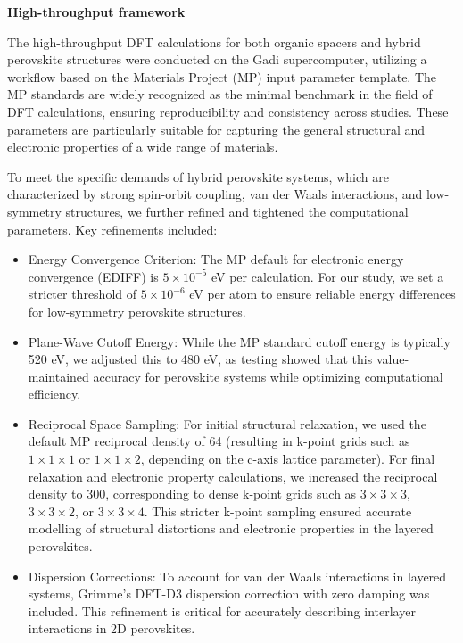 \textbf{High-throughput framework}

The high-throughput DFT calculations for both organic spacers and hybrid perovskite structures were conducted on the Gadi supercomputer, utilizing a workflow based on the Materials Project (MP) input parameter template. The MP standards are widely recognized as the minimal benchmark in the field of DFT calculations, ensuring reproducibility and consistency across studies. These parameters are particularly suitable for capturing the general structural and electronic properties of a wide range of materials.

To meet the specific demands of hybrid perovskite systems, which are characterized by strong spin-orbit coupling, van der Waals interactions, and low-symmetry structures, we further refined and tightened the computational parameters. Key refinements included:

\begin{itemize}
    \item Energy Convergence Criterion: The MP default for electronic energy convergence (EDIFF) is $5\times10^{-5}$ eV per calculation. For our study, we set a stricter threshold of $5\times10^{-6}$ eV per atom to ensure reliable energy differences for low-symmetry perovskite structures.
    \item Plane-Wave Cutoff Energy: While the MP standard cutoff energy is typically 520 eV, we adjusted this to 480 eV, as testing showed that this value-maintained accuracy for perovskite systems while optimizing computational efficiency.
    \item Reciprocal Space Sampling: For initial structural relaxation, we used the default MP reciprocal density of 64 (resulting in k-point grids such as $1\times1\times1$ or $1\times1\times2$, depending on the c-axis lattice parameter). For final relaxation and electronic property calculations, we increased the reciprocal density to 300, corresponding to dense k-point grids such as $3\times3\times3$, $3\times3\times2$, or $3\times3\times4$. This stricter k-point sampling ensured accurate modelling of structural distortions and electronic properties in the layered perovskites.
    \item Dispersion Corrections: To account for van der Waals interactions in layered systems, Grimme’s DFT-D3 dispersion correction with zero damping was included. This refinement is critical for accurately describing interlayer interactions in 2D perovskites.
\end{itemize}


